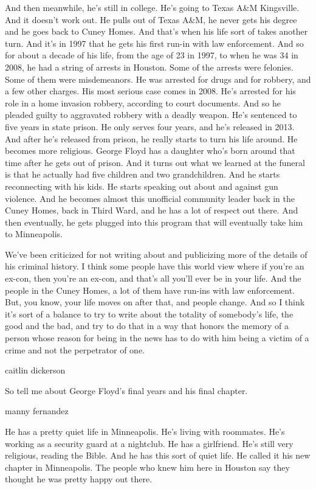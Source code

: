 And then meanwhile, he's still in college. He's going to Texas A\&M
Kingsville. And it doesn't work out. He pulls out of Texas A\&M, he
never gets his degree and he goes back to Cuney Homes. And that's when
his life sort of takes another turn. And it's in 1997 that he gets his
first run-in with law enforcement. And so for about a decade of his
life, from the age of 23 in 1997, to when he was 34 in 2008, he had a
string of arrests in Houston. Some of the arrests were felonies. Some of
them were misdemeanors. He was arrested for drugs and for robbery, and a
few other charges. His most serious case comes in 2008. He's arrested
for his role in a home invasion robbery, according to court documents.
And so he pleaded guilty to aggravated robbery with a deadly weapon.
He's sentenced to five years in state prison. He only serves four years,
and he's released in 2013. And after he's released from prison, he
really starts to turn his life around. He becomes more religious. George
Floyd has a daughter who's born around that time after he gets out of
prison. And it turns out what we learned at the funeral is that he
actually had five children and two grandchildren. And he starts
reconnecting with his kids. He starts speaking out about and against gun
violence. And he becomes almost this unofficial community leader back in
the Cuney Homes, back in Third Ward, and he has a lot of respect out
there. And then eventually, he gets plugged into this program that will
eventually take him to Minneapolis.

We've been criticized for not writing about and publicizing more of the
details of his criminal history. I think some people have this world
view where if you're an ex-con, then you're an ex-con, and that's all
you'll ever be in your life. And the people in the Cuney Homes, a lot of
them have run-ins with law enforcement. But, you know, your life moves
on after that, and people change. And so I think it's sort of a balance
to try to write about the totality of somebody's life, the good and the
bad, and try to do that in a way that honors the memory of a person
whose reason for being in the news has to do with him being a victim of
a crime and not the perpetrator of one.

caitlin dickerson

So tell me about George Floyd's final years and his final chapter.

manny fernandez

He has a pretty quiet life in Minneapolis. He's living with roommates.
He's working as a security guard at a nightclub. He has a girlfriend.
He's still very religious, reading the Bible. And he has this sort of
quiet life. He called it his new chapter in Minneapolis. The people who
knew him here in Houston say they thought he was pretty happy out there.

